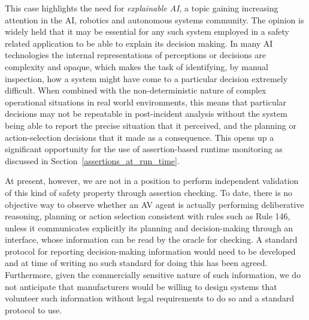 This case highlights the need for \emph{explainable AI}, a topic gaining increasing attention in the AI, robotics and autonomous systems community. The opinion is widely held \cite{deeks2019judicial, o2019legal, wortham2020transparency} that it may be essential for any such system employed in a safety related application to be able to explain its decision making. 
%
In many AI technologies the internal representations of perceptions or decisions are complexity and opaque, which makes the task of identifying, by manual inspection, how a system might have come to a particular decision extremely difficult. When combined with the non-deterministic nature of complex operational situations in real world environments, this means that particular decisions may not be repeatable in post-incident analysis without the system being able to report the precise situation that it perceived, and the planning or action-selection decisions that it made as a consequence. 
%
This opens up a significant opportunity for the use of assertion-based runtime monitoring as discussed in Section~\ref{assertions_at_run_time}.

At present, however, we are not in a position to perform independent validation of this kind of safety property through assertion checking.
To date, there is no objective way to observe whether an AV agent is actually performing deliberative reasoning, planning or action selection consistent with rules such as Rule 146, unless it communicates explicitly its planning and decision-making through an interface, whose information can be read by the oracle for checking. A standard protocol for reporting decision-making information would need to be developed and at time of writing no such standard for doing this has been agreed. Furthermore, given the commercially sensitive nature of such information, we do not anticipate that manufacturers would be willing to design systems that volunteer such information without legal requirements to do so and a standard protocol to use.

